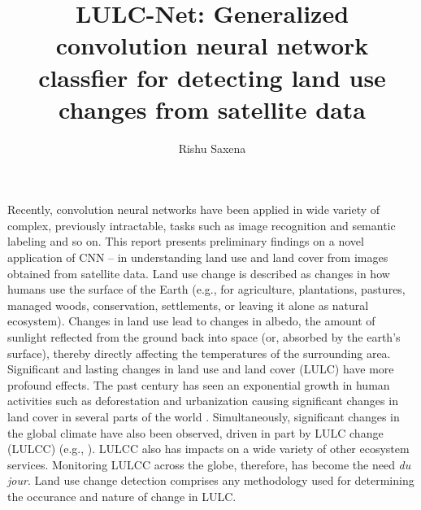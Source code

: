 \documentclass[a4paper,11pt]{article}
\title{LULC-Net: Generalized convolution neural network classfier for detecting land use changes from satellite data}
\date{}
\author{Rishu Saxena}
\begin{document}
\maketitle
Recently, convolution neural networks have been applied in wide
variety of complex, previously intractable, tasks such as image recognition
and semantic labeling and so on. 
This report presents preliminary findings on a novel application of CNN --
in understanding land use and land cover from images obtained from satellite data.
Land use change is described as changes in how humans use the surface
of the Earth (e.g., for agriculture, plantations, pastures, managed woods,
conservation, settlements, or leaving it alone as natural ecosystem).
Changes in land use lead to changes in albedo, the amount of sunlight reflected from 
the ground back into space (or, absorbed by the earth's surface), 
thereby directly affecting the temperatures of the surrounding area.
Significant and lasting changes in land use and land cover (LULC) have more
profound effects.
The past century has seen an exponential growth in human 
activities such as deforestation and urbanization causing significant changes
in land cover in several parts of the world \cite{Hansen}. Simultaneously,
significant changes in the global climate have also been observed, driven
in part by LULC change (LULCC) (e.g., \cite{FallEtAl}). LULCC also has impacts on a
wide variety of other ecosystem services. Monitoring LULCC across the globe,
therefore, has become the need {\it du jour}. Land use change detection
comprises any methodology used for determining the occurance and
nature of change in LULC.
\end{document}
